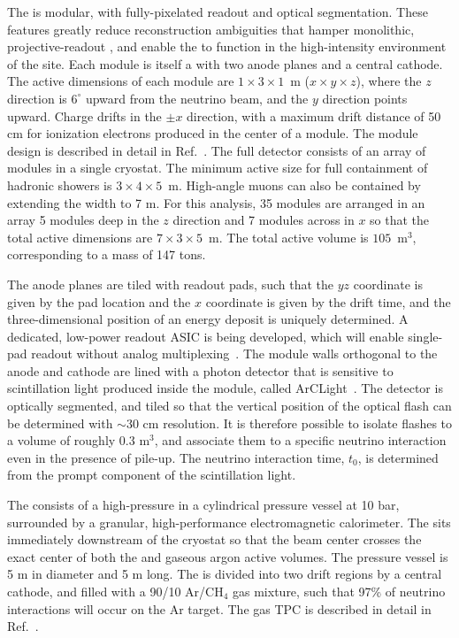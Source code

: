 The  is modular, with fully-\threed  pixelated readout and optical segmentation. These features greatly reduce reconstruction ambiguities that hamper monolithic, projective-readout , and enable the  to function in the high-intensity environment of the   site. Each module is itself a   with two anode planes and a central cathode. The active dimensions of each module are $1 \times 3 \times 1$~m ($x \times y \times z$), where the $z$ direction is $6^{\circ}$ upward from the neutrino beam, and the $y$ direction points upward. Charge drifts in the $\pm x$ direction, with a maximum drift distance of 50 cm for ionization electrons produced in the center of a module. The module design is described in detail in Ref.~\cite{Asaadi:2018xfh}. The full  detector consists of an array of modules in a single cryostat. The minimum active size for full containment of hadronic showers is $3 \times 4 \times 5$~m. High-angle muons can also be contained by extending the width to 7 m. For this analysis, 35 modules are arranged in an array 5 modules deep in the $z$ direction and 7 modules across in $x$ so that the total active dimensions are $7 \times 3 \times 5$~m. The total active  volume is $105$~m$^{3}$, corresponding to a mass of 147 tons.

The anode planes are tiled with readout pads, such that the $yz$ coordinate is given by the pad location and the $x$ coordinate is given by the drift time, and the three-dimensional position of an energy deposit is uniquely determined. A dedicated, low-power readout ASIC is being developed, which will enable single-pad readout without analog multiplexing~\cite{Dwyer:2018phu}. The module walls orthogonal to the anode and cathode are lined with a photon detector that is sensitive to scintillation light produced inside the module, called ArCLight~\cite{Auger:2017flc}. The detector is optically segmented, and tiled so that the vertical position of the optical flash can be determined with $\sim$30 cm resolution. It is therefore possible to isolate flashes to a volume of roughly 0.3 m$^{3}$, and associate them to a specific neutrino interaction even in the presence of pile-up. The neutrino interaction time, $t_{0}$, is determined from the prompt component of the scintillation light.

The  consists of a high-pressure  in a cylindrical pressure vessel at 10 bar, surrounded by a granular, high-performance electromagnetic calorimeter. The  sits immediately downstream of the  cryostat so that the beam center crosses the exact center of both the  and gaseous argon active volumes. The pressure vessel is 5 m in diameter and 5 m long. The  is divided into two drift regions by a central cathode, and filled with a 90/10 Ar/CH$_{4}$ gas mixture, such that 97\% of neutrino interactions will occur on the Ar target. The gas TPC is described in detail in Ref.~\cite{bib:docdb12388}.

